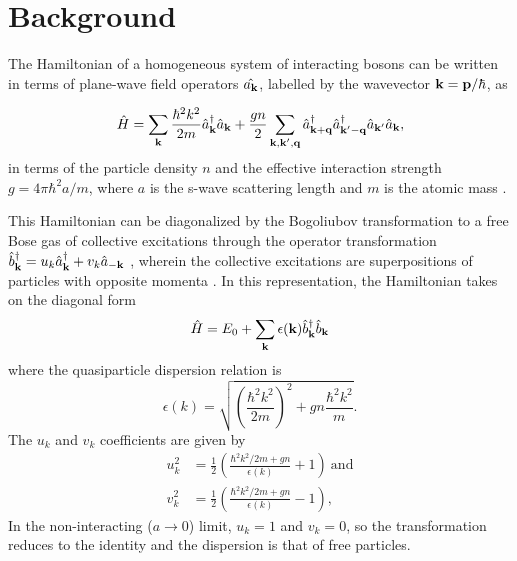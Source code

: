 \section{Background}


	The Hamiltonian of a homogeneous system of interacting bosons can be written in terms of plane-wave field operators $\hat{a_{\textbf{k}}}$, labelled by the wavevector $\textbf{k}=\textbf{p}/\hbar$, as

	\begin{equation}
		\hat{H} = \sum_{\textbf{k}} \frac{\hbar^2k^2}{2m}\hat{a}_{\textbf{k}}^\dagger \hat{a}_{\textbf{k}} + \frac{g n}{2}\sum_{\textbf{k},\textbf{k}',{\bf q}}\hat{a}_{\textbf{k}+{\bf q}}^\dagger\hat{a}_{\textbf{k}'-{\bf q}}^\dagger \hat{a}_{\textbf{k}'}\hat{a}_{\textbf{k}},
	\end{equation}
	in terms of the particle density $n$ and the effective interaction strength $g=4\pi\hbar^2a/m$, where $a$ is the s-wave scattering length and $m$ is the atomic mass \cite{PitaevskiiStringari,PethickSmith}.
   
    This Hamiltonian can be diagonalized by the Bogoliubov transformation to a free Bose gas of collective excitations through the operator transformation $\hat{b}_{\textbf{k}}^\dagger = u_k \hat{a}_{\textbf{k}}^\dagger + v_k \hat{a}_{-\textbf{k}}$ \cite{Bogoliubov47,PethickSmith}, wherein the collective excitations are superpositions of particles with opposite momenta \cite{Vogels02}. 
    In this representation, the Hamiltonian takes on the diagonal form 
    \begin{equation}
    	\hat{H} = E_0 + \sum_{\textbf{k}} \epsilon(\textbf{k}) \hat{b}^{\dagger}_{\textbf{k}} \hat{b}_{\textbf{k}}
    \end{equation}
	where the quasiparticle dispersion relation is
	\begin{equation}
		\epsilon(k) = \sqrt{\left(\frac{\hbar^2k^2}{2m}\right)^2 + gn\frac{ \hbar^2k^2}{m}}.
	\end{equation}
    The $u_k$ and $v_k$ coefficients are given by
	\begin{align}
		u_{k}^2 &= \frac{1}{2}\left(\frac{\hbar^2k^2/2m + gn}{\epsilon(k)} + 1\right)~\textrm{and}\\
		v_{k}^2 &= \frac{1}{2}\left(\frac{\hbar^2k^2/2m + gn}{\epsilon(k)} - 1\right),
	\end{align}
	In the non-interacting ($a\rightarrow0$) limit, $u_k=1$ and $v_k=0$, so the transformation reduces to the identity and the dispersion is that of free particles. 


